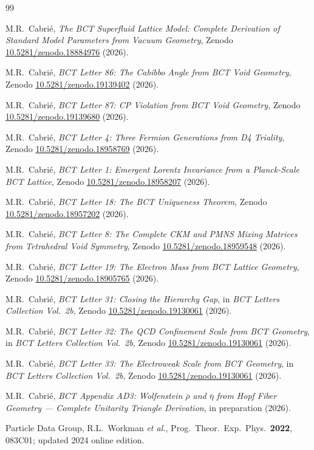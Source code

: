 \documentclass[aps,prl,twocolumn,showpacs,superscriptaddress]{revtex4-2}
\begin{document}
\begin{thebibliography}{99}

M.R.~Cabri\'{e}, \textit{The BCT Superfluid Lattice Model: Complete
Derivation of Standard Model Parameters from Vacuum Geometry},
Zenodo \href{https://doi.org/10.5281/zenodo.18884976}{10.5281/zenodo.18884976} (2026).

M.R.~Cabri\'{e}, \textit{BCT Letter 86: The Cabibbo Angle from BCT
Void Geometry},
Zenodo \href{https://doi.org/10.5281/zenodo.19139402}{10.5281/zenodo.19139402} (2026).

M.R.~Cabri\'{e}, \textit{BCT Letter 87: CP Violation from BCT Void
Geometry},
Zenodo \href{https://doi.org/10.5281/zenodo.19139680}{10.5281/zenodo.19139680} (2026).

M.R.~Cabri\'{e}, \textit{BCT Letter 4: Three Fermion Generations from
D4 Triality},
Zenodo \href{https://doi.org/10.5281/zenodo.18958769}{10.5281/zenodo.18958769} (2026).

M.R.~Cabri\'{e}, \textit{BCT Letter 1: Emergent Lorentz Invariance
from a Planck-Scale BCT Lattice},
Zenodo \href{https://doi.org/10.5281/zenodo.18958207}{10.5281/zenodo.18958207} (2026).

M.R.~Cabri\'{e}, \textit{BCT Letter 18: The BCT Uniqueness Theorem},
Zenodo \href{https://doi.org/10.5281/zenodo.18957202}{10.5281/zenodo.18957202} (2026).

M.R.~Cabri\'{e}, \textit{BCT Letter 8: The Complete CKM and PMNS
Mixing Matrices from Tetrahedral Void Symmetry},
Zenodo \href{https://doi.org/10.5281/zenodo.18959548}{10.5281/zenodo.18959548} (2026).

M.R.~Cabri\'{e}, \textit{BCT Letter 19: The Electron Mass from BCT
Lattice Geometry},
Zenodo \href{https://doi.org/10.5281/zenodo.18905765}{10.5281/zenodo.18905765} (2026).

M.R.~Cabri\'{e}, \textit{BCT Letter 31: Closing the Hierarchy Gap},
in \textit{BCT Letters Collection Vol.~2b},
Zenodo \href{https://doi.org/10.5281/zenodo.19130061}{10.5281/zenodo.19130061} (2026).

M.R.~Cabri\'{e}, \textit{BCT Letter 32: The QCD Confinement Scale
from BCT Geometry},
in \textit{BCT Letters Collection Vol.~2b},
Zenodo \href{https://doi.org/10.5281/zenodo.19130061}{10.5281/zenodo.19130061} (2026).

M.R.~Cabri\'{e}, \textit{BCT Letter 33: The Electroweak Scale from
BCT Geometry},
in \textit{BCT Letters Collection Vol.~2b},
Zenodo \href{https://doi.org/10.5281/zenodo.19130061}{10.5281/zenodo.19130061} (2026).

M.R.~Cabri\'{e}, \textit{BCT Appendix AD3: Wolfenstein $\bar\rho$ and
$\bar\eta$ from Hopf Fiber Geometry --- Complete Unitarity Triangle
Derivation}, in preparation (2026).

Particle Data Group, R.L.~Workman \textit{et al.},
Prog.\ Theor.\ Exp.\ Phys.\ \textbf{2022}, 083C01;
updated 2024 online edition.

\end{thebibliography}
\end{document}
